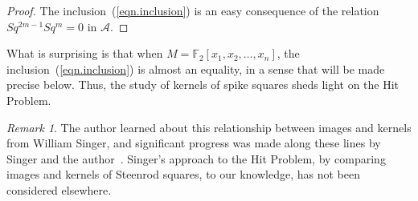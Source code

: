\documentclass{amsart}
\theoremstyle{plain}
\theoremstyle{definition}
\theoremstyle{remark}
\newtheorem{remark}[theorem]{Remark}
\begin{document}
\begin{proof}
  The inclusion~(\ref{eqn.inclusion}) is an easy consequence of the
  relation $Sq^{2m-1}Sq^m = 0$ in $\mathcal{A}$.
\end{proof}
What is surprising is that when $M = {\mathbb{F}}_2[x_1, x_2, \ldots, x_n]$, the
inclusion~(\ref{eqn.inclusion}) is almost an equality, in a sense that
will be made precise below.  Thus, the study of kernels of spike
squares sheds light on the Hit Problem.
\begin{remark}
  The author learned about this relationship between images and
  kernels from William Singer, and significant progress was made along
  these lines by Singer and the author~\cite{AS, A2}.  Singer's
  approach to the Hit Problem, by comparing images and kernels of
  Steenrod squares, to our knowledge, has not been considered
  elsewhere.
\end{remark}
\end{document}
